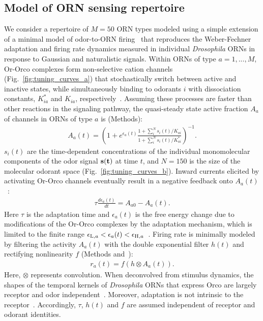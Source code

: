 \documentclass[9pt,twocolumn,twoside,lineno]{pnas-new}
\begin{document}
\subsection*{Model of ORN sensing repertoire}

We consider a repertoire of $M=50$ ORN types modeled using a simple extension of a minimal model of odor-to-ORN firing~\cite{srinivas_elife} that reproduces the Weber-Fechner adaptation and firing rate dynamics measured in individual \textit{Drosophila} ORNs in response to Gaussian and naturalistic signals. Within ORNs of type $a=1,...,M$, Or-Orco complexes form non-selective cation channels (Fig.~\ref{fig:tuning_curves_a}) that stochastically switch between active and inactive states, while simultaneously binding to odorants $i$ with dissociation constants, $K^*_{ia}$ and $K_{ia}$, respectively~\cite{nagel_wilson_biophysical,srinivas_elife}. Assuming these processes are faster than other reactions in the signaling pathway, the quasi-steady state active fraction $A_a$ of channels in ORNs of type $a$ is (Methods):
\begin{align}
A_a(t) = \left(1 + e^{\epsilon_a(t)}\frac{1 + \sum_i^N s_i(t)/K_{ai}}{1 + \sum_i^N s_i(t)/K^*_{ai}}\right)^{-1}.
\label{eq:steady_state_act_OR}
\end{align}
$s_i(t)$ are the time-dependent concentrations of the individual monomolecular components of the odor signal $\bf{s}(t)$ at time $t$, and $N=150$ is the size of the molecular odorant space (Fig.~\ref{fig:tuning_curves_b}). Inward currents elicited by activating Or-Orco channels eventually result in a negative feedback onto $A_a(t)$~\cite{nagel_wilson_biophysical,srinivas_elife,cao_WL}:
\begin{align}
\tau\frac{d\epsilon_a(t)}{dt} = {A}_{a0} - A_a(t).
\label{eq:adaptation_dynamics}
\end{align}
Here $\tau$ is the adaptation time and $\epsilon_a(t)$ is the free energy change due to modifications of the Or-Orco complexes by the adaptation mechanism, which is  limited to the finite range $\epsilon_{\textup{L}, a} < \epsilon_a(t) < \epsilon_{\textup{H}, a}$~\cite{srinivas_elife}. Firing rate is minimally modeled by filtering the activity $A_a(t)$ with the double exponential filter $h(t)$ and rectifying nonlinearity $f$ (Methods and~\cite{srinivas_elife}):
\begin{align}
r_a(t)=f\left(h\otimes A_a(t)\right).
\label{eq:firing_machinery}
\end{align}
Here, $\otimes$ represents convolution. When deconvolved from stimulus dynamics, the shapes of the temporal kernels of \textit{Drosophila} ORNs that express Orco are largely receptor and odor independent~\cite{martelli,srinivas_elife,si2017invariances}. Moreover, adaptation is not intrinsic to the receptor~\cite{nagel_wilson_biophysical}. Accordingly, $\tau$, $h(t)$ and $f$ are assumed independent of receptor and odorant identities. 
\end{document}
